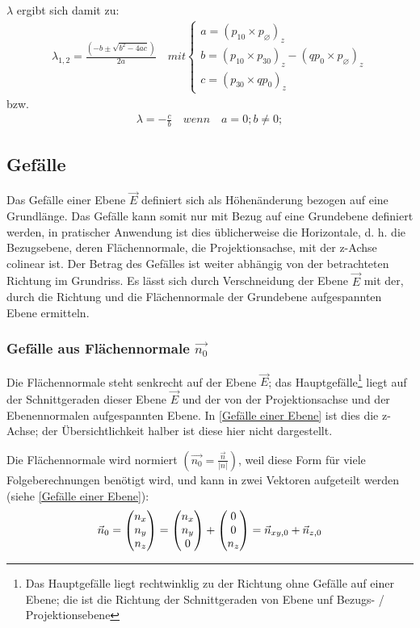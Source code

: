 $\lambda$ ergibt sich damit zu:
\begin{align}
	\boxed{
		\lambda_{1, 2} = \frac{(-b\pm \sqrt{b^{2}-4ac})}{2a}
	} \quad mit \begin{cases}a = (p_{10} \times p_{\varnothing})_{z}\\
	b = (p_{10} \times p_{30})_{z} - (qp_{0} \times p_{\varnothing})_{z}\\
	c = (p_{30} \times qp_{0})_{z}
	\end{cases}
\end{align}
bzw.
\begin{align}
	\boxed{
		\lambda = -\frac{c}{b}
	} \quad wenn \quad a=0; b\neq0;
\end{align}

\subsection{Gefälle}
Das Gefälle einer Ebene $\vec{E}$ definiert sich als Höhenänderung bezogen auf eine Grundlänge. Das Gefälle kann somit nur mit Bezug auf eine Grundebene definiert werden, in pratischer Anwendung ist dies üblicherweise die Horizontale, d. h. die Bezugsebene, deren Flächennormale, die Projektionsachse, mit der z-Achse colinear ist. Der Betrag des Gefälles ist weiter abhängig von der betrachteten Richtung im Grundriss. Es lässt sich durch Verschneidung der Ebene $\vec{E}$ mit der, durch die Richtung und die Flächennormale der Grundebene aufgespannten Ebene ermitteln.

\subsubsection{Gefälle aus Flächennormale $\vec{n_{0}}$}
Die Flächennormale steht senkrecht auf der Ebene $\vec{E}$; das Hauptgefälle\footnote{Das Hauptgefälle liegt rechtwinklig zu der Richtung ohne Gefälle auf einer Ebene; die ist die Richtung der Schnittgeraden von Ebene unf Bezugs- / Projektionsebene} liegt auf der Schnittgeraden dieser Ebene $\vec{E}$ und der von der Projektionsachse und der Ebenennormalen aufgespannten Ebene. In \cref{Gefälle einer Ebene} ist dies die z-Achse; der Übersichtlichkeit halber ist diese hier nicht dargestellt.

Die Flächennormale wird normiert $(\vec{n_{0}} = \frac{\vec{n}}{|n|})$, weil diese Form für viele Folgeberechnungen benötigt wird, und kann in zwei Vektoren aufgeteilt werden (siehe \cref{Gefälle einer Ebene}):
\begin{equation*}
	\vec{n}_{0} = \begin{pmatrix} n_{x} \\ n_{y} \\ n_{z} \end{pmatrix}
	=\begin{pmatrix} n_{x} \\ n_{y} \\ 0 \end{pmatrix} + \begin{pmatrix} 0 \\ 0 \\ n_{z} \end{pmatrix}
	=\vec{n}_{xy, 0} + \vec{n}_{z, 0}
\end{equation*}

